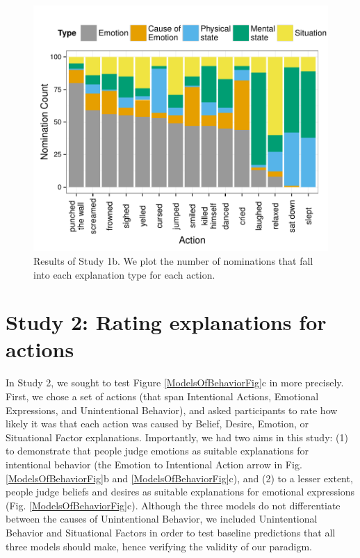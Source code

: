 \documentclass[10pt,letterpaper]{article}
\begin{document}
\begin{figure}[htb!]
\begin{center}\includegraphics[width=1\columnwidth]{images/study1b_codePlot.pdf}\end{center}
\caption{ Results of Study 1b. We plot the number of nominations that fall into each explanation type for each action. }
\label{Study1bResultsFig}
\end{figure}


\section{Study 2: Rating explanations for actions}


In Study 2, we sought to test Figure \ref{ModelsOfBehaviorFig}c in more precisely. First, we chose a set of actions (that span Intentional Actions, Emotional Expressions, and Unintentional Behavior), and asked participants to rate how likely it was that each action was caused by Belief, Desire, Emotion, or Situational Factor explanations. Importantly, we had two aims in this study: (1) to demonstrate that people judge emotions as suitable explanations for intentional behavior (the Emotion to Intentional Action arrow in Fig. \ref{ModelsOfBehaviorFig}b and \ref{ModelsOfBehaviorFig}c), and (2) to a lesser extent, people judge beliefs and desires as suitable explanations for emotional expressions (Fig. \ref{ModelsOfBehaviorFig}c). Although the three models do not differentiate between the causes of Unintentional Behavior, we included Unintentional Behavior and Situational Factors in order to test baseline predictions that all three models should make, hence verifying the validity of our paradigm.
\end{document}
